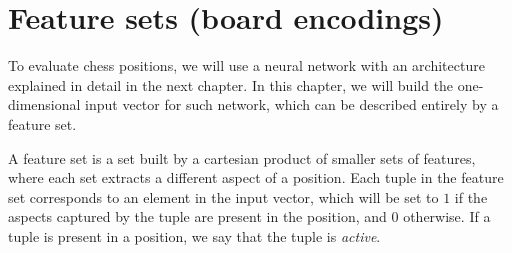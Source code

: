 \newcommand{\white}{\fullmoon}
\newcommand{\black}{\newmoon}

\newcommand{\bigtimes}{\mathop{\raisebox{-0.5ex}{\scalebox{2}{$\times$}}}}

\newcommand{\pieceBoard}{
    \newcount\pieceindex
    \setcounter{pieceindex}{0}
    \raisebox{-7ex}{
        \centering
        \chessboard[
            tinyboard,
            showmover=false,
            margin=false,
            padding=false,
            hlabel=false,
            vlabel=false,
            pgfstyle={text},
            text=\fontsize{1.2ex}{1.2ex}\bfseries\sffamily \currentwq,
            markboard
        ]
    }
}
\newcommand{\pieceRolesTable}{
    \begin{tabular}{|l|}
        \hline
        \sympawn\ Pawn \\
        \hline
        \symknight\ Knight \\
        \hline
        \symbishop\ Bishop \\
        \hline
        \symrook\ Rook \\
        \hline
        \symqueen\ Queen \\
        \hline
        \symking\ King \\
        \hline
    \end{tabular}
}
\newcommand{\pieceColorsTable}{
    \begin{tabular}{|l|}
        \hline
        $\white$ White \\
        \hline
        $\black$ Black \\
        \hline
    \end{tabular}
}

\newcommand{\fs}[1]{\textsc{#1}}


\section{Feature sets (board encodings)}

To evaluate chess positions, we will use a neural network with an architecture explained in detail in the next chapter. In this chapter, we will build the one-dimensional input vector for such network, which can be described entirely by a feature set.

A feature set is a set built by a cartesian product of smaller sets of features, where each set extracts a different aspect of a position. Each tuple in the feature set corresponds to an element in the input vector, which will be set to $1$ if the aspects captured by the tuple are present in the position, and $0$ otherwise. If a tuple is present in a position, we say that the tuple is \textit{active}.

